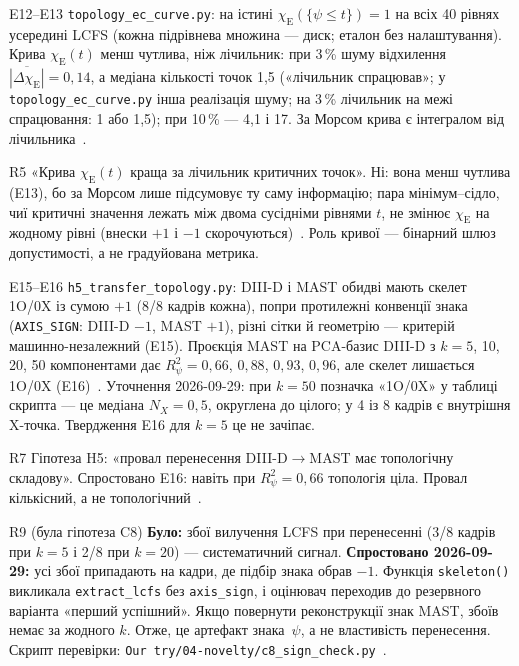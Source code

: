 \begin{established}{E12--E13}
\texttt{topology\_ec\_curve.py}: на істині $\chi_{\mathrm{E}}(\{\psi\le t\})=1$ на всіх 40 рівнях усередині LCFS (кожна підрівнева множина --- диск; еталон без налаштування). Крива $\chi_{\mathrm{E}}(t)$ менш чутлива, ніж лічильник: при 3\,\% шуму відхилення $\overline{|\Delta\chi_{\mathrm{E}}|}=0{,}14$, а медіана кількості точок 1,5 («лічильник спрацював»; у \texttt{topology\_ec\_curve.py} інша реалізація шуму; на 3\,\% лічильник на межі спрацювання: 1 або 1,5); при 10\,\% --- 4,1 і 17. За Морсом крива є інтегралом від лічильника~\cite{ProjRegisters}.
\end{established}

\begin{refuted}{R5}
«Крива $\chi_{\mathrm{E}}(t)$ краща за лічильник критичних точок». Ні: вона менш чутлива (E13), бо за Морсом лише підсумовує ту саму інформацію; пара мінімум--сідло, чиї критичні значення лежать між двома сусідніми рівнями $t$, не змінює $\chi_{\mathrm{E}}$ на жодному рівні (внески $+1$ і $-1$ скорочуються)~\cite{ProjRegisters}. Роль кривої --- бінарний шлюз допустимості, а не градуйована метрика.
\end{refuted}

\begin{established}{E15--E16}
\texttt{h5\_transfer\_topology.py}: DIII-D і MAST обидві мають скелет 1O/0X із сумою $+1$ (8/8 кадрів кожна), попри протилежні конвенції знака (\texttt{AXIS\_SIGN}: DIII-D $-1$, MAST $+1$), різні сітки й геометрію --- критерій машинно-незалежний (E15). Проєкція MAST на PCA-базис DIII-D з $k=5$, 10, 20, 50 компонентами дає $R^2_\psi=0{,}66$, $0{,}88$, $0{,}93$, $0{,}96$, але скелет лишається 1O/0X (E16)~\cite{ProjRegisters}. Уточнення 2026-09-29: при $k=50$ позначка «1O/0X» у таблиці скрипта --- це медіана $N_X=0{,}5$, округлена до цілого; у 4 із 8 кадрів є внутрішня X-точка. Твердження E16 для $k=5$ це не зачіпає.
\end{established}

\begin{refuted}{R7}
Гіпотеза H5: «провал перенесення DIII-D$\to$MAST має топологічну складову». Спростовано E16: навіть при $R^2_\psi=0{,}66$ топологія ціла. Провал кількісний, а не топологічний~\cite{ProjRegisters}.
\end{refuted}

\begin{refuted}{R9 (була гіпотеза C8)}
\textbf{Було:} збої вилучення LCFS при перенесенні (3/8 кадрів при $k=5$ і 2/8 при $k=20$) --- систематичний сигнал. \textbf{Спростовано 2026-09-29:} усі збої припадають на кадри, де підбір знака обрав $-1$. Функція \texttt{skeleton()} викликала \texttt{extract\_lcfs} без \texttt{axis\_sign}, і оцінювач переходив до резервного варіанта «перший успішний». Якщо повернути реконструкції знак MAST, збоїв немає за жодного $k$. Отже, це артефакт знака~$\psi$, а не властивість перенесення. Скрипт перевірки: \texttt{Our try/04-novelty/c8\_sign\_check.py}~\cite{ProjRegisters}.
\end{refuted}

